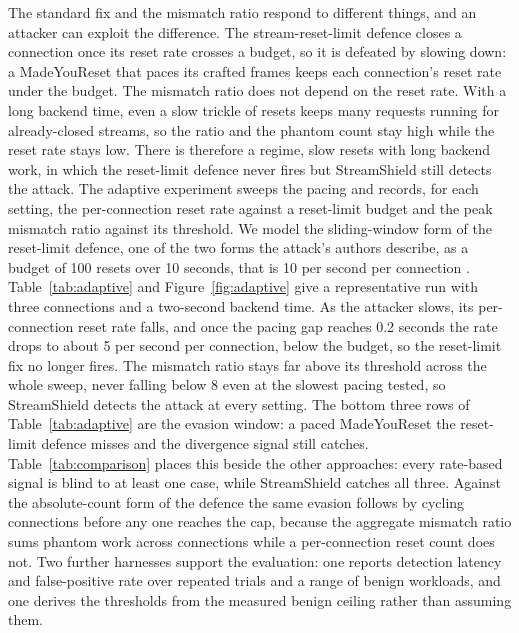 \documentclass[a4paper,fleqn]{cas-dc}
\begin{document}
The standard fix and the mismatch ratio respond to different things, and an attacker can exploit the difference. The stream-reset-limit defence closes a connection once its reset rate crosses a budget, so it is defeated by slowing down: a MadeYouReset that paces its crafted frames keeps each connection's reset rate under the budget. The mismatch ratio does not depend on the reset rate. With a long backend time, even a slow trickle of resets keeps many requests running for already-closed streams, so the ratio and the phantom count stay high while the reset rate stays low. There is therefore a regime, slow resets with long backend work, in which the reset-limit defence never fires but StreamShield still detects the attack. The adaptive experiment sweeps the pacing and records, for each setting, the per-connection reset rate against a reset-limit budget and the peak mismatch ratio against its threshold. We model the sliding-window form of the reset-limit defence, one of the two forms the attack's authors describe, as a budget of 100 resets over 10 seconds, that is 10 per second per connection \cite{madeyouresetPaper}. Table~\ref{tab:adaptive} and Figure~\ref{fig:adaptive} give a representative run with three connections and a two-second backend time. As the attacker slows, its per-connection reset rate falls, and once the pacing gap reaches 0.2 seconds the rate drops to about 5 per second per connection, below the budget, so the reset-limit fix no longer fires. The mismatch ratio stays far above its threshold across the whole sweep, never falling below 8 even at the slowest pacing tested, so StreamShield detects the attack at every setting. The bottom three rows of Table~\ref{tab:adaptive} are the evasion window: a paced MadeYouReset the reset-limit defence misses and the divergence signal still catches. Table~\ref{tab:comparison} places this beside the other approaches: every rate-based signal is blind to at least one case, while StreamShield catches all three. Against the absolute-count form of the defence the same evasion follows by cycling connections before any one reaches the cap, because the aggregate mismatch ratio sums phantom work across connections while a per-connection reset count does not. Two further harnesses support the evaluation: one reports detection latency and false-positive rate over repeated trials and a range of benign workloads, and one derives the thresholds from the measured benign ceiling rather than assuming them.
\end{document}
